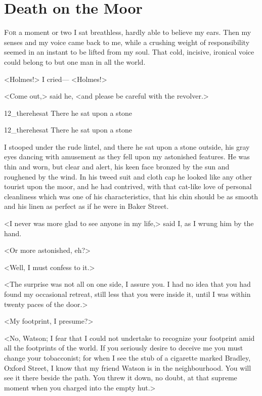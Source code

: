 \chapter{Death on the Moor}
\lettrine{F}{or} a moment or two I sat breathless, hardly able to believe my ears. Then my senses and my voice came back to me, while a crushing weight of responsibility seemed in an instant to be lifted from my soul. That cold, incisive, ironical voice could belong to but one man in all the world.

<Holmes!> I cried— <Holmes!>

<Come out,> said he, <and please be careful with the revolver.>

\begin{letter}
	\begin{bwbigpic}
			[1.0]  
		{12_therehesat}
		{There he sat upon a stone}
	\end{bwbigpic}
\end{letter}
\begin{a4}
	\begin{bwbigpic}
			[1.0]  
		{12_therehesat}
		{There he sat upon a stone}
	\end{bwbigpic}
\end{a4}

I stooped under the rude lintel, and there he sat upon a stone outside, his gray eyes dancing with amusement as they fell upon my astonished features. He was thin and worn, but clear and alert, his keen face bronzed by the sun and roughened by the wind. In his tweed suit and cloth cap he looked like any other tourist upon the moor, and he had contrived, with that cat-like love of personal cleanliness which was one of his characteristics, that his chin should be as smooth and his linen as perfect as if he were in Baker Street.

<I never was more glad to see anyone in my life,> said I, as I wrung him by the hand.

<Or more astonished, eh?>

<Well, I must confess to it.>

<The surprise was not all on one side, I assure you. I had no idea that you had found my occasional retreat, still less that you were inside it, until I was within twenty paces of the door.>

<My footprint, I presume?>

<No, Watson; I fear that I could not undertake to recognize your footprint amid all the footprints of the world. If you seriously desire to deceive me you must change your tobacconist; for when I see the stub of a cigarette marked Bradley, Oxford Street, I know that my friend Watson is in the neighbourhood. You will see it there beside the path. You threw it down, no doubt, at that supreme moment when you charged into the empty hut.>

